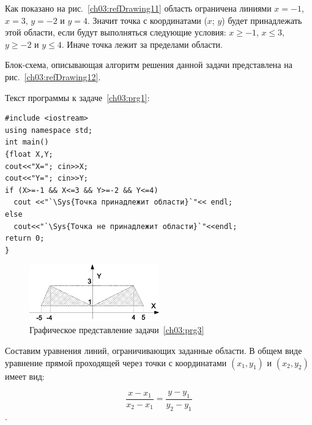 Как показано на рис.~\ref{ch03:refDrawing11} область ограничена линиями $x=-1$, $x=3$,
$y=-2$ и $y=4$. Значит точка с координатами ($x$;
$y$) будет принадлежать этой области, если будут выполняться следующие условия: 
$x\geqslant -1$, $x\leqslant 3$, $y\geqslant -2$ и $y\leqslant 4$. Иначе точка лежит за пределами области.

Блок-схема, описывающая алгоритм решения данной задачи представлена на рис.~\ref{ch03:refDrawing12}.


Текст программы к задаче~\ref{ch03:prg1}:
\begin{lstlisting}
#include <iostream>
using namespace std;
int main()
{float X,Y;
cout<<"X="; cin>>X;
cout<<"Y="; cin>>Y;
if (X>=-1 && X<=3 && Y>=-2 && Y<=4)
  cout <<"`\Sys{Точка принадлежит области}`"<< endl;
else 
  cout<<"`\Sys{Точка не принадлежит области}`"<<endl;
return 0;
}
\end{lstlisting}


\begin{figure}[htb]
\begin{center}
\includegraphics[width=0.5\textwidth]{img/ris_3_14}
\caption{Графическое представление задачи~\ref{ch03:prg3}}
\label{ch03:refDrawing13}
\end{center}
\end{figure}

Составим уравнения линий, ограничивающих заданные области. В общем виде уравнение прямой проходящей через точки с
координатами  $(x_1,y_1)$ и  $(x_2,y_2)$  имеет вид:

 $$\frac{x-x_1}{x_2-x_1}=\frac{y-y_1}{y_2-y_1}$$.

